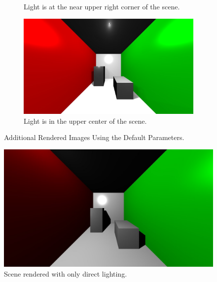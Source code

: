 \begin{figure}
\begin{subfigure}[b]{0.5\textwidth}
                \caption{Light is at the near upper right corner of the scene.}
                \label{fig:sample4}
        \end{subfigure}
        \begin{subfigure}[b]{0.5\textwidth}
                \includegraphics[width=\textwidth]{sample5.jpg}
                \caption{Light is in the upper center of the scene.}
                \label{fig:sample5}
        \end{subfigure}
        \caption{Additional Rendered Images Using the Default Parameters.}\label{fig:default}
\end{figure}


\begin{figure}[h!]
  \centering
    \includegraphics[width=1.0\textwidth]{direct_only.jpg}
    \caption{Scene rendered with only direct lighting.}
	\label{fig:directonly}
\end{figure}


